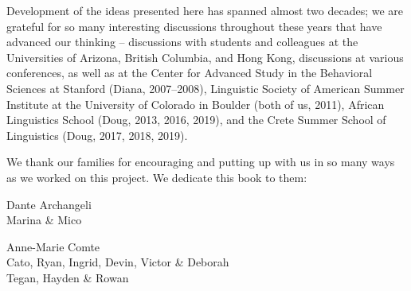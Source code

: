 Development of the ideas presented here has spanned almost two decades; we are grateful for so many interesting discussions throughout these years that have advanced our thinking -- discussions with students and colleagues  at the Universities of Arizona, British Columbia, and Hong Kong, discussions at various conferences, as well as at the Center for Advanced Study in the Behavioral Sciences at Stanford (Diana, 2007–2008), Linguistic Society of American Summer Institute at the University of Colorado in Boulder (both of us, 2011), African Linguistics School (Doug, 2013, 2016, 2019), and the Crete Summer School of Linguistics (Doug, 2017, 2018, 2019).

We thank our families for encouraging and putting up with us in so many ways as we worked on this project. We dedicate this book to them:\smallskip\\
\noindent\begin{minipage}[t]{\widthof{Dante Archangeli}}
Dante Archangeli\\ Marina \& Mico
\end{minipage}\hfill\begin{minipage}[t]{\widthof{Cato, Ryan, Ingrid, Devin, Victor \& Deborah}}
Anne-Marie Comte\\Cato, Ryan, Ingrid, Devin, Victor \& Deborah\\Tegan, Hayden \& Rowan
\end{minipage}
